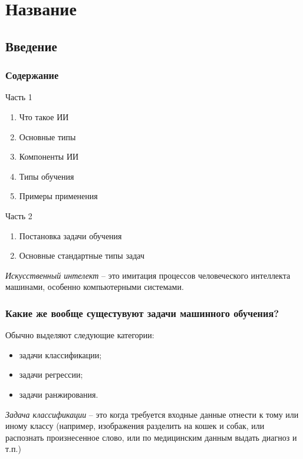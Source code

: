 \chapter{Название}



\section{Введение}

\subsection{Содержание}

Часть 1
\begin{enumerate}
	\item Что такое ИИ
	\item Основные типы
	\item Компоненты ИИ
	\item Типы обучения
	\item  Примеры применения
\end{enumerate}

Часть 2
\begin{enumerate}
	\item Постановка задачи обучения
	\item Основные стандартные типы задач
\end{enumerate}

\begin{definition}
	\emph{Искусственный интелект} -- это имитация процессов человеческого интеллекта машинами, особенно компьютерными системами.
\end{definition}

\subsection{Какие же вообще сущестувуют задачи машинного обучения?}

Обычно выделяют следующие категории:

\begin{itemize}
	\item задачи классификации;
	\item задачи регрессии;
	\item задачи ранжирования.
\end{itemize}

\begin{definition}
	\emph{Задача классификации} -- это когда требуется входные данные отнести к тому или иному классу (например, изображения разделить на кошек и собак, или распознать произнесенное слово, или по медицинским данным выдать диагноз и т.п.)
\end{definition}

